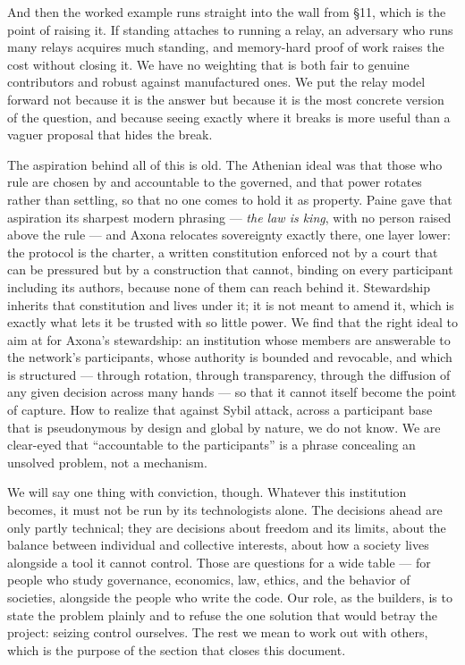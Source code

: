 \documentclass[nobib,justified]{tufte-handout}
\begin{document}
And then the worked example runs straight into the wall from \S11, which is
the point of raising it. If standing attaches to running a relay, an adversary who
runs many relays acquires much standing, and memory-hard proof of work raises the
cost without closing it. We have no weighting that is both fair to genuine
contributors and robust against manufactured ones. We put the relay model forward
not because it is the answer but because it is the most concrete version of the
question, and because seeing exactly where it breaks is more useful than a vaguer
proposal that hides the break.

The aspiration behind all of this is old. The Athenian ideal was that those who
rule are chosen by and accountable to the governed, and that power rotates rather
than settling, so that no one comes to hold it as property. Paine gave that
aspiration its sharpest modern phrasing --- \emph{the law is king}, with no
person raised above the rule --- and Axona relocates sovereignty exactly there,
one layer lower: the protocol is the charter, a written constitution enforced
not by a court that can be pressured but by a construction that cannot, binding
on every participant including its authors, because none of them can reach
behind it. Stewardship inherits that constitution and lives under it; it is not
meant to amend it, which is exactly what lets it be trusted with so little
power. We find that the right
ideal to aim at for Axona's stewardship: an institution whose members are
answerable to the network's participants, whose authority is bounded and
revocable, and which is structured --- through rotation, through transparency,
through the diffusion of any given decision across many hands --- so that it
cannot itself become the point of capture. How to realize that against Sybil
attack, across a participant base that is pseudonymous by design and global by
nature, we do not know. We are clear-eyed that ``accountable to the participants''
is a phrase concealing an unsolved problem, not a mechanism.

We will say one thing with conviction, though. Whatever this institution becomes,
it must not be run by its technologists alone. The decisions ahead are only partly
technical; they are decisions about freedom and its limits, about the balance
between individual and collective interests, about how a society lives alongside a
tool it cannot control. Those are questions for a wide table --- for people who
study governance, economics, law, ethics, and the behavior of societies, alongside
the people who write the code. Our role, as the builders, is to state the problem plainly and to refuse the one solution that would betray the project: seizing
control ourselves. The rest we mean to work out with others, which is the purpose
of the section that closes this document.
\end{document}
